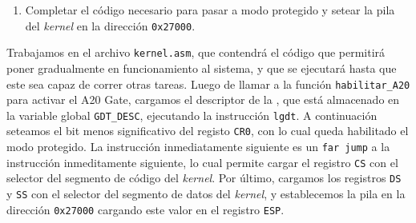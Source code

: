     \noindent\begin{table}[h]
      \caption{Descriptores de segmento en la .} \label{table:gdt_entries}
    \end{table}

    \begin{enumerate}[resume,label=(\alph*)]
      \item Completar el código necesario para pasar a modo protegido y setear la pila del \emph{kernel} en la dirección \texttt{0x27000}.
    \end{enumerate}

    Trabajamos en el archivo \texttt{kernel.asm}, que contendrá el código que permitirá poner gradualmente en funcionamiento al sistema, y que se ejecutará hasta que este sea capaz de correr otras tareas.
    Luego de llamar a la función \texttt{habilitar\_A20} para activar el A20 Gate, cargamos el descriptor de la , que está almacenado en la variable global \texttt{GDT\_DESC}, ejecutando la instrucción \texttt{lgdt}. A continuación seteamos el bit menos significativo del registo \texttt{CR0}, con lo cual queda habilitado el modo protegido. La instrucción inmediatamente siguiente es un \texttt{far jump} a la instrucción inmeditamente siguiente, lo cual permite cargar el registro \texttt{CS} con el selector del segmento de código del \emph{kernel}. Por último, cargamos los registros \texttt{DS} y \texttt{SS} con el selector del segmento de datos del \emph{kernel}, y establecemos la pila en la dirección \texttt{0x27000} cargando este valor en el registro \texttt{ESP}.

